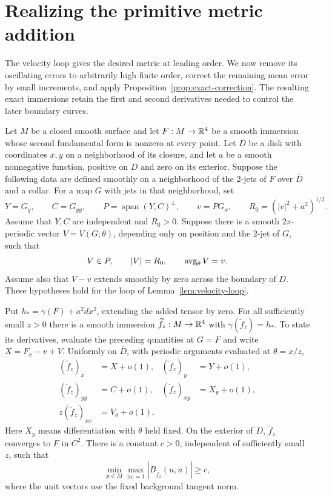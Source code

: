 \section{Realizing the primitive metric addition}
\label{sec:primitive-realization}

The velocity loop gives the desired metric at leading order.  We now remove
its oscillating errors to arbitrarily high finite order, correct the remaining
mean error by small increments, and apply
Proposition~\ref{prop:exact-correction}.  The resulting exact immersions retain
the first and second derivatives needed to control the later boundary curves.

\begin{proposition}
\label{prop:primitive-realization}
Let $M$ be a closed smooth surface and let $F:M\to\mathbb{R}^4$ be a smooth immersion
whose second fundamental form is nonzero at every point.  Let $D$ be a disk
with coordinates $x,y$ on a neighborhood of its closure, and let $a$ be a
smooth nonnegative function, positive on $D$ and zero on its exterior.
Suppose the following data are defined smoothly on a neighborhood of the
$2$-jets of $F$ over $\overline D$ and a collar.  For a map $G$ with jets in
that neighborhood, set
\[
 Y=G_y,\qquad C=G_{yy},\qquad
 P=\operatorname{span}(Y,C)^\perp,\qquad
 v=PG_x,\qquad R_0=(|v|^2+a^2)^{1/2}.
\]
Assume that $Y,C$ are independent and $R_0>0$.  Suppose there is a smooth
$2\pi$-periodic vector $V=V(G;\theta)$, depending only on position and the
$2$-jet of $G$, such that
\[
 V\in P,\qquad |V|=R_0,\qquad \operatorname{avg}_\theta V=v.
\]
Assume also that $V-v$ extends smoothly by zero across the boundary of $D$.
These hypotheses hold for the loop of Lemma~\ref{lem:velocity-loop}.

Put $h_*=\gamma(F)+a^2dx^2$, extending the added tensor by zero.  For all
sufficiently small $z>0$ there is a smooth immersion
$\widetilde f_z:M\to\mathbb{R}^4$ with $\gamma(\widetilde f_z)=h_*$.  To state its
derivatives, evaluate the preceding quantities at $G=F$ and write
$X=F_x-v+V$.  Uniformly on $\overline D$, with periodic arguments evaluated
at $\theta=x/z$,
\begin{equation}
\begin{aligned}
 (\widetilde f_z)_x&=X+o(1),&
 (\widetilde f_z)_y&=Y+o(1),\\
 (\widetilde f_z)_{yy}&=C+o(1),&
 (\widetilde f_z)_{xy}&=X_y+o(1),\\
 z(\widetilde f_z)_{xx}&=V_\theta+o(1).
\end{aligned}
\label{eq:realization-asymptotics}
\end{equation}
Here $X_y$ means differentiation with $\theta$ held fixed.  On the exterior
of $D$, $\widetilde f_z$ converges to $F$ in $C^2$.  There is a constant
$c>0$, independent of sufficiently small $z$, such that
\[
 \min_{p\in M}\max_{|u|=1}
       |B_{\widetilde f_z}(u,u)|\ge c,
\]
where the unit vectors use the fixed background tangent norm.
\end{proposition}

